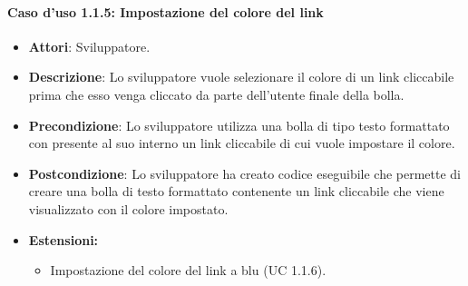 \paragraph{Caso d'uso 1.1.5: Impostazione del colore del link}
\begin{itemize}
\item\textbf{Attori}: Sviluppatore.
\item\textbf{Descrizione}: Lo sviluppatore vuole selezionare il colore di un link cliccabile prima che esso venga cliccato da parte dell'utente finale della bolla.
\item\textbf{Precondizione}: Lo sviluppatore utilizza una bolla di tipo testo formattato con presente al suo interno un link cliccabile di cui vuole impostare il colore.
\item\textbf{Postcondizione}: Lo sviluppatore ha creato codice eseguibile che permette di creare una bolla di testo formattato contenente un link cliccabile che viene visualizzato con il colore impostato.

\item\textbf{Estensioni:}
	\begin{itemize}
		\item Impostazione del colore del link a blu (UC 1.1.6).
	\end{itemize}
\end{itemize}